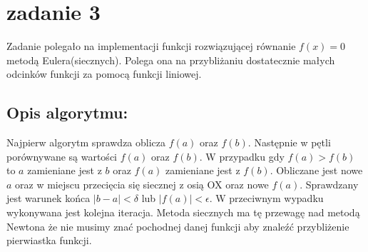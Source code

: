 \section{zadanie 3}
Zadanie polegało na implementacji funkcji rozwiązującej równanie \(f(x) = 0\) metodą Eulera(siecznych). Polega ona na przybliżaniu dostatecznie małych odcinków funkcji za pomocą funkcji liniowej. 

\subsection{Opis algorytmu: }
Najpierw algorytm sprawdza oblicza \(f(a)\) oraz \(f(b)\). Następnie w pętli porównywane są wartości \(f(a)\) oraz \(f(b)\). W przypadku gdy \(f(a) > f(b)\) to \(a\) zamieniane jest z \(b\) oraz \(f(a)\) zamieniane jest z \(f(b)\). Obliczane jest nowe \(a\) oraz w miejscu przecięcia się siecznej z osią OX oraz nowe \(f(a)\). Sprawdzany jest warunek końca \(|b-a| < \delta\) lub \(|f(a)| < \epsilon\). W przeciwnym wypadku wykonywana jest kolejna iteracja. Metoda siecznych ma tę przewagę nad metodą Newtona że nie musimy znać pochodnej danej funkcji aby znaleźć przybliżenie pierwiastka funkcji.